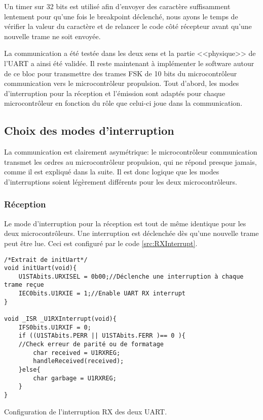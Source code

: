 Un timer sur 32 bits est utilisé afin d'envoyer des caractère suffisamment lentement pour qu'une fois le breakpoint déclenché, nous ayons le temps de vérifier la valeur du caractère et de relancer le code côté récepteur avant qu'une nouvelle trame ne soit envoyée.

La communication a été testée dans les deux sens et la partie <<physique>> de l'UART a ainsi été validée. Il reste maintenant à implémenter le software autour de ce bloc pour transmettre des trames FSK de 10 bits du microcontrôleur communication vers le microcontrôleur propulsion. Tout d'abord, les modes d'interruption pour la réception et l'émission sont adaptés pour chaque microcontrôleur en fonction du rôle que celui-ci joue dans la communication.

\subsection{Choix des modes d'interruption}
La communication est clairement asymétrique: le microcontrôleur communication transmet les ordres au microcontrôleur propulsion, qui ne répond presque jamais, comme il est expliqué dans la suite. Il est donc logique que les modes d'interruptions soient légèrement différents pour les deux microcontrôleurs.

\subsubsection{Réception}
Le mode d'interruption pour la réception est tout de même identique pour les deux microcontrôleurs. Une interruption est déclenchée dès qu'une nouvelle trame peut être lue. Ceci est configuré par le code \ref{src:RXInterrupt}.
\begin{listing}[htbp]
\begin{verbatim}
/*Extrait de initUart*/
void initUart(void){
    U1STAbits.URXISEL = 0b00;//Déclenche une interruption à chaque trame reçue
    IEC0bits.U1RXIE = 1;//Enable UART RX interrupt
}

void _ISR _U1RXInterrupt(void){
    IFS0bits.U1RXIF = 0;
    if ((U1STAbits.PERR || U1STAbits.FERR )== 0 ){
    //Check erreur de parité ou de formatage
        char received = U1RXREG;
        handleReceived(received);
    }else{
        char garbage = U1RXREG;
    }
}
\end{verbatim}
\caption{Configuration de l'interruption RX des deux UART.\label{src:RXInterrupt}}
\end{listing}

